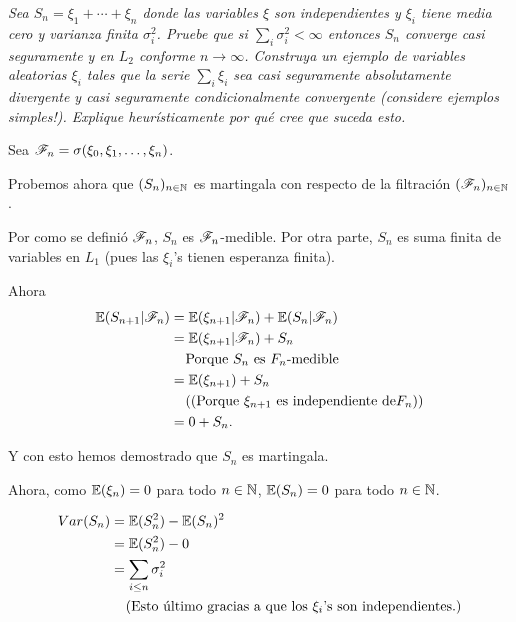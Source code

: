 \emph{
    Sea $S_n=\xi_1+\cdots+\xi_n$ donde las variables $\xi$ son independientes y $\xi_i$ tiene 
    media cero y varianza finita $\sigma_i^2$. Pruebe que si $\sum_i \sigma_i^2<\infty$ entonces 
    $S_n$ converge casi seguramente y en $L_2$ conforme $n\to\infty$. Construya un ejemplo de 
    variables aleatorias $\xi_i$ tales que la serie $\sum_i \xi_i$ sea casi seguramente absolutamente 
    divergente y casi seguramente condicionalmente convergente (considere ejemplos simples!). 
    Explique heur\'isticamente por qu\'e cree que suceda esto.
}

\afterstatement\par\null

Sea $\mathscr{F}_n = \sigma( \xi_0, \xi_1, \dots, \xi_n)$.\par\null


Probemos ahora que $(S_n)_{n \in \mathbb{N}}$ es martingala con respecto de la filtración $(\mathscr{F}_n)_{n \in \mathbb{N}}$.\par\null

Por como se definió $\mathscr{F}_n$, $S_n$ es $\mathscr{F}_n$-medible. Por otra parte, $S_n$ es suma finita de variables en $L_1$ 
(pues las $\xi_i$'s tienen esperanza finita).

Ahora
\begin{align}
    \mathbb{E}(S_{n+1} | \mathscr{F}_n)  &=  \mathbb{E}(\xi_{n+1} | \mathscr{F}_n) + \mathbb{E}(S_n | \mathscr{F}_n)                       \\
                        &=  \mathbb{E}(\xi_{n+1} | \mathscr{F}_n) + S_n                                  \\
                        &\;\;\;\;\mbox{Porque $S_n$ es $F_n$-medible}                   \\
                        &=  \mathbb{E}(\xi_{n+1}) + S_n                                         \\
                        &\;\;\;\;\mbox{((Porque $\xi_{n+1}$ es independiente de$F_n$))}        \\
                        &=  0 + S_n.                                                    \\
\end{align}\par\null

Y con esto hemos demostrado que $S_n$ es martingala.\par\null

Ahora, como $\mathbb{E}(\xi_n) = 0$ para todo $n \in \mathbb{N}$, $\mathbb{E}(S_n) = 0$ para todo $n \in \mathbb{N}$.

\begin{align}
        Var(S_n)    &=  \mathbb{E}(S_n^2) - \mathbb{E}(S_n)^2                                               \\
                    &=  \mathbb{E}(S_n^2) - 0                                                       \\
                    &=  \sum_{i \leq n} \sigma_i^2                                          \\
                    &\;\;\;\;\mbox{(Esto último gracias a que los $\xi_i$'s son independientes.)}
\end{align}
